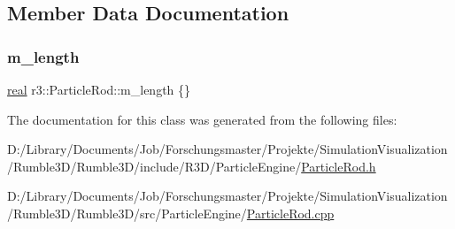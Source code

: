 \subsection{Member Data Documentation}
\mbox{\label{classr3_1_1_particle_rod_af146e442c0ddcb83161f115da58fa026}} 
\subsubsection{\texorpdfstring{m\+\_\+length}{m\_length}}
{\footnotesize\ttfamily \mbox{\hyperlink{namespacer3_ab2016b3e3f743fb735afce242f0dc1eb}{real}} r3\+::\+Particle\+Rod\+::m\+\_\+length \{\}\hspace{0.3cm}{\ttfamily [protected]}}



The documentation for this class was generated from the following files\+:\begin{DoxyCompactItemize}
\item 
D\+:/\+Library/\+Documents/\+Job/\+Forschungsmaster/\+Projekte/\+Simulation\+Visualization/\+Rumble3\+D/\+Rumble3\+D/include/\+R3\+D/\+Particle\+Engine/\mbox{\hyperlink{_particle_rod_8h}{Particle\+Rod.\+h}}\item 
D\+:/\+Library/\+Documents/\+Job/\+Forschungsmaster/\+Projekte/\+Simulation\+Visualization/\+Rumble3\+D/\+Rumble3\+D/src/\+Particle\+Engine/\mbox{\hyperlink{_particle_rod_8cpp}{Particle\+Rod.\+cpp}}\end{DoxyCompactItemize}
